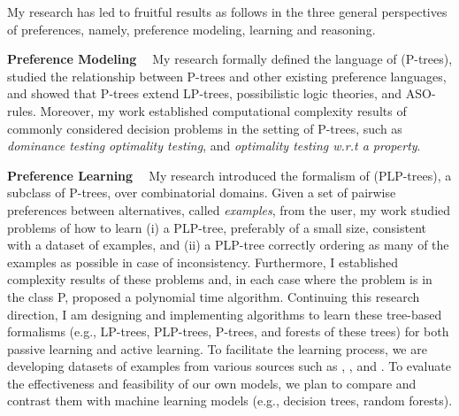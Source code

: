 My research has led to fruitful results as follows in the three general perspectives
of preferences, namely, preference modeling, learning and reasoning.

\smallskip \noindent \textbf{Preference Modeling \ }
\noindent My research formally defined the language 
of  (P-trees),
studied the relationship between P-trees and other existing preference languages, and
showed that P-trees extend  
LP-trees, possibilistic logic theories, and ASO-rules\cite{liu2014preference,conf/adt15/liuT}.
Moreover, my work established computational complexity results of commonly considered decision
problems in the setting of P-trees, such as \textit{dominance testing} 
\textit{optimality testing}, and
\textit{optimality testing w.r.t a property}.

\smallskip \noindent \textbf{Preference Learning \ }
My research introduced the formalism of  (PLP-trees), 
a subclass of P-trees, over combinatorial domains\cite{conf/aaai15/LiuT}.
Given a set of pairwise preferences between alternatives, called \textit{examples}, from the user,
my work studied problems of how to learn (i) a PLP-tree, preferably of a small size, 
consistent with a dataset of examples, and (ii) a PLP-tree correctly
ordering as many of the examples as possible in case
of inconsistency. Furthermore, I established complexity results
of these problems and, in each case where the problem
is in the class P, proposed a polynomial time algorithm.
Continuing this research direction,
I am designing and implementing algorithms to learn these tree-based 
formalisms (e.g., LP-trees, PLP-trees, P-trees, and forests of these trees) 
for both passive learning and active learning.
To facilitate the learning process, we are developing datasets of examples
from various sources such as ,
, and .
To evaluate the effectiveness and feasibility of our own models, we plan to
compare and contrast them with machine learning models (e.g., decision trees, random forests).

